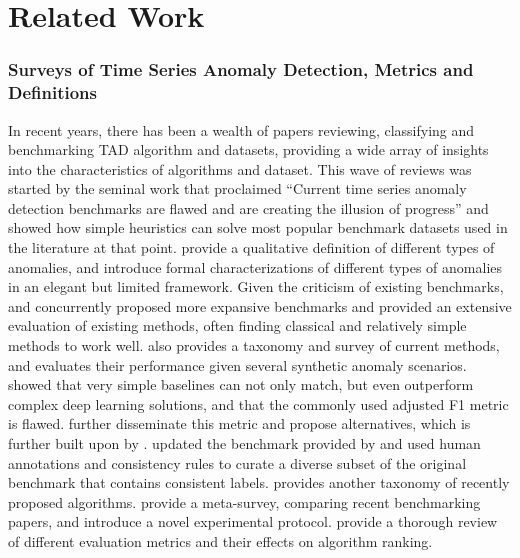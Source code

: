 \section{Related Work}
\subsubsection{Surveys of Time Series Anomaly Detection, Metrics and Definitions}\label{sec:surveys}
In recent years, there has been a wealth of papers reviewing, classifying and benchmarking TAD algorithm and datasets, providing a wide array of insights into the characteristics of algorithms and dataset.
This wave of reviews was started by the seminal work \cite{wu2021current} that proclaimed ``Current time series anomaly detection benchmarks are flawed and are creating the illusion of progress'' and showed how simple heuristics can solve most popular benchmark datasets used in the literature at that point.
\citet{lai2021revisiting} provide a qualitative definition of different types of anomalies, and introduce formal characterizations of different types of anomalies in an elegant but limited framework.
Given the criticism of existing benchmarks, \citet{schmidl2022anomaly} and \citet{paparrizos2022tsb} concurrently proposed more expansive benchmarks and provided an extensive evaluation of existing methods, often finding classical and relatively simple methods to work well. \citet{schmidl2022anomaly} also provides a taxonomy and survey of current methods, and evaluates their performance given several synthetic anomaly scenarios. \citet{sarfrazposition} showed that very simple baselines can not only match, but even outperform complex deep learning solutions, and that the commonly used adjusted F1 metric is flawed. \citet{kim2022towards} further disseminate this metric and propose alternatives, which is further built upon by \citet{paparrizos2022volume}.
\citet{liu2024elephant} updated the benchmark provided by \citet{paparrizos2022tsb} and used human annotations and consistency rules to curate a diverse subset of the original benchmark that contains consistent labels. 
\citet{liu2024time} provides another taxonomy of recently proposed algorithms. \citet{mejri2024unsupervised} provide a meta-survey, comparing recent benchmarking papers, and introduce a novel experimental protocol.
\citet{sorbo2024navigating} provide a thorough review of different evaluation metrics and their effects on algorithm ranking.

